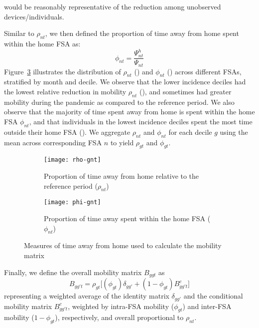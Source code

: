 would be reasonably representative of the reduction
among unobserved devices/individuals.
\par
Similar to $\rho_{nt}$, we then defined
the proportion of time away from home spent within the home FSA as:
\begin{equation}
  \phi_{nt} = \frac{\Psi^h_{nt}}{\Psi_{nt}}
\end{equation}
Figure~\ref{fig:t-away} illustrates the distribution of
$\rho_{nt}$ () and
$\phi_{nt}$ ()
across different FSAs, stratified by month and decile.
We observe that the lower incidence deciles had
the lowest relative reduction in mobility $\rho_{nt}$ (),
and sometimes had greater mobility during the pandemic as compared to the reference period.
We also observe that the majority of time spent away from home
is spent within the home FSA $\phi_{nt}$,
and that individuals in the lowest incidence deciles
spent the most time outside their home FSA ().
We aggregate $\rho_{nt}$ and $\phi_{nt}$ for each decile $g$
using the mean across corresponding FSA $n$ to yield $\rho_{gt}$ and $\phi_{gt}$.
\begin{figure}
  \centering
  \begin{subfigure}[t]{0.45\linewidth}
    \texttt{[image: rho-gnt]}
    \caption{Proportion of time away from home relative to the reference period
      ($\rho_{nt}$)}
    \label{fig:rho-gt}
  \end{subfigure}\quad
  \begin{subfigure}[t]{0.45\linewidth}
    \texttt{[image: phi-gnt]}
    \caption{Proportion of time away spent within the home FSA
      ($\phi_{nt}$)}
    \label{fig:phi-gt}
  \end{subfigure}
  \caption{Measures of time away from home used to calculate the mobility matrix}
  \label{fig:t-away}
\end{figure}
\par
Finally, we define the overall mobility matrix $B_{ggt}$ as
\begin{equation}\label{eq:Bgg.t}
  B_{gg't} = \rho_{gt} \Big[
    (\phi_{gt}) \delta_{gg'} + (1-\phi_{gt}) B^c_{gg't}
  \Big]
\end{equation}
representing a weighted average of
the identity matrix $\delta_{gg'}$ and
the conditional mobility matrix $B^c_{gg't}$, weighted by
intra-FSA mobility ($\phi_{gt}$) and
inter-FSA mobility ($1 - \phi_{gt}$), respectively,
and overall proportional to $\rho_{nt}$.
